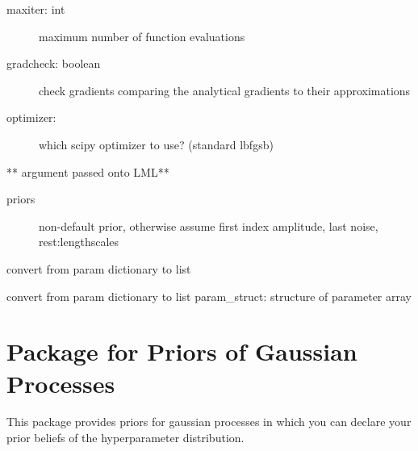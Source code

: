 \documentclass[letterpaper,10pt,english]{sphinxmanual}
\begin{document}
\begin{fulllineitems}
\begin{description}
\item[{maxiter: int}] \leavevmode
maximum number of function evaluations

\item[{gradcheck: boolean }] \leavevmode
check gradients comparing the analytical gradients to their approximations

\item[{optimizer: }] \leavevmode
which scipy optimizer to use? (standard lbfgsb)

\end{description}

** argument passed onto LML**
\begin{description}
\item[{priors}] 
non-default prior, otherwise assume
first index amplitude, last noise, rest:lengthscales

\end{description}

\end{fulllineitems}


\begin{fulllineitems}
\label{opt_hyper:pygp.optimize.optimize_base.param_dict_to_list}
convert from param dictionary to list

\end{fulllineitems}


\begin{fulllineitems}
\label{opt_hyper:pygp.optimize.optimize_base.param_list_to_dict}
convert from param dictionary to list
param\_struct: structure of parameter array

\end{fulllineitems}

\label{priors:module-pygp.priors}

\chapter{Package for Priors of Gaussian Processes}
\label{priors::doc}\label{priors:package-for-priors-of-gaussian-processes}
This package provides priors for gaussian processes in which
you can declare your prior beliefs of the hyperparameter
distribution.
\label{priors:module-pygp.priors.lnpriors}
\end{document}
